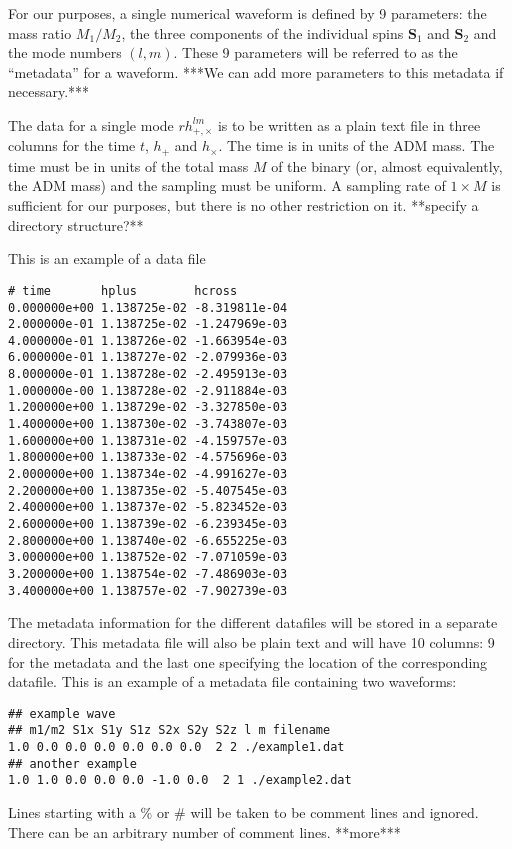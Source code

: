 \documentclass[amsmath,amssymb]{article}
\begin{document}
For our purposes, a single numerical waveform is defined by 9
parameters: the mass ratio $M_1/M_2$, the three components of the
individual spins $\mathbf{S}_1$ and $\mathbf{S}_2$ and the mode
numbers $(l,m)$.  These 9 parameters will be referred to as the
``metadata'' for a waveform.  ***We can add more parameters to this
metadata if necessary.***

The data for a single mode $rh_{+,\times}^{lm}$ is to be written as a
plain text file in three columns for the time $t$, $h_+$ and
$h_\times$.  The time is in units of the ADM mass. The time must be in
units of the total mass $M$ of the binary (or, almost equivalently,
the ADM mass) and the sampling must be uniform.  A sampling rate of
$1\times M$ is sufficient for our purposes, but there is no other
restriction on it. **specify a directory structure?**

This is an example of a data file 
\begin{verbatim}
# time       hplus        hcross
0.000000e+00 1.138725e-02 -8.319811e-04
2.000000e-01 1.138725e-02 -1.247969e-03
4.000000e-01 1.138726e-02 -1.663954e-03
6.000000e-01 1.138727e-02 -2.079936e-03
8.000000e-01 1.138728e-02 -2.495913e-03
1.000000e-00 1.138728e-02 -2.911884e-03
1.200000e+00 1.138729e-02 -3.327850e-03
1.400000e+00 1.138730e-02 -3.743807e-03
1.600000e+00 1.138731e-02 -4.159757e-03
1.800000e+00 1.138733e-02 -4.575696e-03
2.000000e+00 1.138734e-02 -4.991627e-03
2.200000e+00 1.138735e-02 -5.407545e-03
2.400000e+00 1.138737e-02 -5.823452e-03
2.600000e+00 1.138739e-02 -6.239345e-03
2.800000e+00 1.138740e-02 -6.655225e-03
3.000000e+00 1.138752e-02 -7.071059e-03
3.200000e+00 1.138754e-02 -7.486903e-03
3.400000e+00 1.138757e-02 -7.902739e-03
\end{verbatim}

The metadata information for the different datafiles will be stored in
a separate directory.  This metadata file will also be plain text and
will have 10 columns: 9 for the metadata and the last one specifying
the location of the corresponding datafile.  This is an example of a
metadata file containing two waveforms:
\begin{verbatim}
## example wave
## m1/m2 S1x S1y S1z S2x S2y S2z l m filename
1.0 0.0 0.0 0.0 0.0 0.0 0.0  2 2 ./example1.dat
## another example
1.0 1.0 0.0 0.0 0.0 -1.0 0.0  2 1 ./example2.dat
\end{verbatim}
Lines starting with a $\%$ or $\#$ will be taken to be comment lines and
ignored. There can be an arbitrary number of comment lines.  **more***
\end{document}
